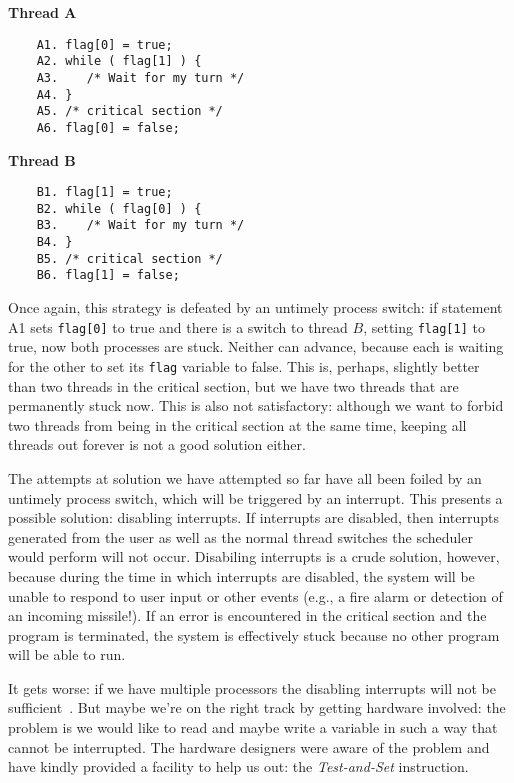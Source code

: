 \begin{multicols}{2}
\textbf{Thread A}
	\begin{verbatim}
	A1. flag[0] = true;
	A2. while ( flag[1] ) {
	A3.    /* Wait for my turn */
	A4. }
	A5. /* critical section */
	A6. flag[0] = false;
	\end{verbatim}
\columnbreak
\textbf{Thread B}
	\begin{verbatim}
	B1. flag[1] = true;
	B2. while ( flag[0] ) {
	B3.    /* Wait for my turn */
	B4. }
	B5. /* critical section */
	B6. flag[1] = false;
	\end{verbatim}
\end{multicols}

Once again, this strategy is defeated by an untimely process switch: if statement A1 sets \texttt{flag[0]} to true and there is a switch to thread $B$, setting \texttt{flag[1]} to true, now both processes are stuck. Neither can advance, because each is waiting for the other to set its \texttt{flag} variable to false. This is, perhaps, slightly better than two threads in the critical section, but we have two threads that are permanently stuck now. This is also not satisfactory: although we want to forbid two threads from being in the critical section at the same time, keeping all threads out forever is not a good solution either.

The attempts at solution we have attempted so far have all been foiled by an untimely process switch, which will be triggered by an interrupt. This presents a possible solution: disabling interrupts. If interrupts are disabled, then interrupts generated from the user as well as the normal thread switches the scheduler would perform will not occur. Disabiling interrupts is a crude solution, however, because during the time in which interrupts are disabled, the system will be unable to respond to user input or other events (e.g., a fire alarm or detection of an incoming missile!). If an error is encountered in the critical section and the program is terminated, the system is effectively stuck because no other program will be able to run.

It gets worse: if we have multiple processors the disabling interrupts will not be sufficient~\cite{osi}. But maybe we're on the right track by getting hardware involved: the problem is we would like to read and maybe write a variable in such a way that cannot be interrupted. The hardware designers were aware of the problem and have kindly provided a facility to help us out: the \textit{Test-and-Set} instruction. 

